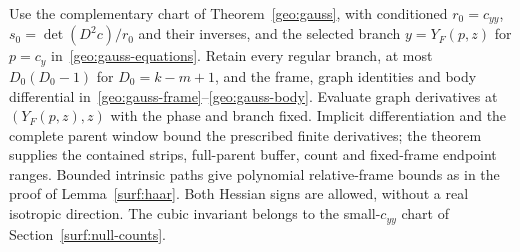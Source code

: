 \documentclass[11pt]{amsart}
\theoremstyle{definition}
\theoremstyle{remark}
\numberwithin{equation}{section}
\begin{document}
Use the complementary chart of Theorem~\ref{geo:gauss}, with conditioned $r_0=c_{yy}$, $s_0=\det(D^2c)/r_0$ and their inverses, and the selected branch $y=Y_F(p,z)$ for $p=c_y$ in~\eqref{geo:gauss-equations}. Retain every regular branch, at most $D_0(D_0-1)$ for $D_0=k-m+1$, and the frame, graph identities and body differential in~\eqref{geo:gauss-frame}--\eqref{geo:gauss-body}. Evaluate graph derivatives at $(Y_F(p,z),z)$ with the phase and branch fixed. Implicit differentiation and the complete parent window bound the prescribed finite derivatives; the theorem supplies the contained strips, full-parent buffer, count and fixed-frame endpoint ranges. Bounded intrinsic paths give polynomial relative-frame bounds as in the proof of Lemma~\ref{surf:haar}. Both Hessian signs are allowed, without a real isotropic direction. The cubic invariant belongs to the small-$c_{yy}$ chart of Section~\ref{surf:null-counts}.
\end{document}
